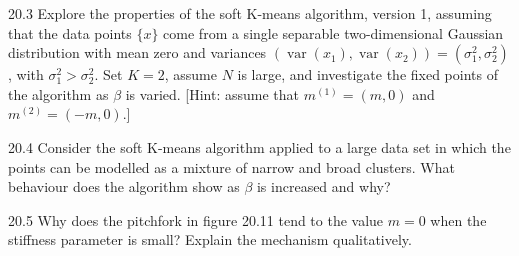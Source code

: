 \documentclass[12pt, a4paper]{article}
\begin{document}
\begin{prob}{20.3}
Explore the properties of the soft K-means algorithm, version 1, assuming that the data points $\{x\}$ come from a single separable two-dimensional Gaussian distribution with mean zero and variances $(\operatorname{var}(x_1), \operatorname{var}(x_2)) = (\sigma_1^2, \sigma_2^2)$, with $\sigma_1^2 > \sigma_2^2$. Set $K = 2$, assume $N$ is large, and investigate the fixed points of the algorithm as $\beta$ is varied. [Hint: assume that $m^{(1)} = (m, 0)$ and $m^{(2)} = (-m, 0)$.]
\end{prob}
\begin{sol}
\end{sol}
\bigskip

\begin{prob}{20.4}
Consider the soft K-means algorithm applied to a large data set in which the points can be modelled as a mixture of narrow and broad clusters. What behaviour does the algorithm show as $\beta$ is increased and why?
\end{prob}
\begin{sol}
\end{sol}
\bigskip

\begin{prob}{20.5}
Why does the pitchfork in figure 20.11 tend to the value $m = 0$ when the stiffness parameter is small? Explain the mechanism qualitatively.
\end{prob}
\begin{sol}
\end{sol}
\bigskip
\end{document}

